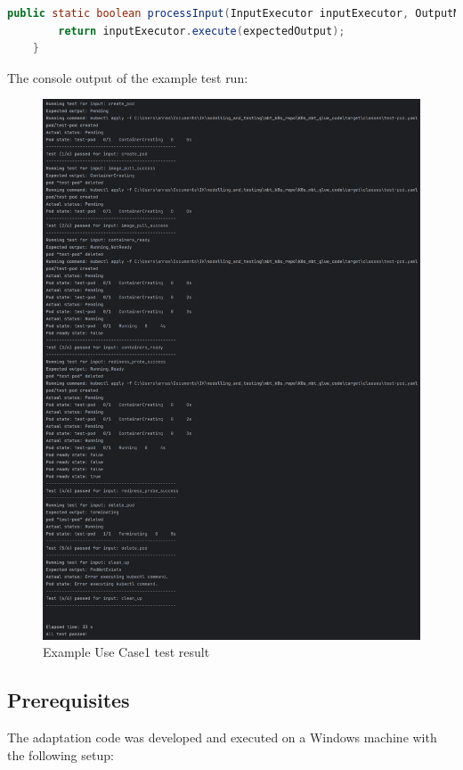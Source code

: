 \documentclass[main.tex]{subfiles}
\begin{document}
\begin{lstlisting}[language=Java]
public static boolean processInput(InputExecutor inputExecutor, OutputMapper expectedOutput) throws FileNotFoundException, URISyntaxException, InterruptedException {
        return inputExecutor.execute(expectedOutput);
    }    
\end{lstlisting}

The console output of the example test run:

\begin{figure}[H]
    \centering
    \includegraphics[height=0.85\paperheight,width=\textwidth]{test_results/Example_Use_Case1_testrun.png}
    \caption{Example Use Case1 test result}
    \label{fig:example}

\end{figure}

\subsection{Prerequisites}
The adaptation code was developed and executed on a Windows machine with the following setup:
\end{document}
